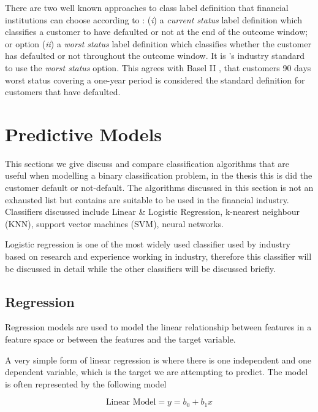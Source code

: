 There are two well known approaches to class label definition that financial institutions can choose according to \cite{anderson_credit_2007}: (\textit{i}) a \textit{current status} label definition which classifies a customer to have defaulted or not at the end of the outcome window; or option (\textit{ii}) a \textit{worst status} label definition which classifies whether the customer has defaulted or not throughout the outcome window. It is \subjectname's industry standard to use the \textit{worst status} option. This agrees with Basel II \citep{basel_international_2006}, that customers 90 days worst status covering a one-year period is considered the standard definition for customers that have defaulted. 



\section{Predictive Models}
This sections we give discuss and compare classification algorithms that are useful when modelling a binary classification problem, in the thesis this is did the customer default or not-default. The algorithms discussed in this section is not an exhausted list but contains are suitable to be used in the financial industry. Classifiers discussed include Linear \& Logistic Regression, k-nearest neighbour (KNN), support vector machines (SVM), neural networks. 

Logistic regression is one of the most widely used classifier used by industry based on research and experience working in industry, therefore this classifier will be discussed in detail while the other classifiers will be discussed briefly.

\subsection{Regression} \label{Reg}
Regression models are used to model the linear relationship between features in a feature space or between the features and the target variable. 

A very simple form of linear regression is where there is one independent and one dependent variable, which is the target we are attempting to predict. The model is often represented by the following model

\begin{equation} \label{eq:reg}
	\text{Linear Model} = y = b_0 + b_1x
\end{equation}

